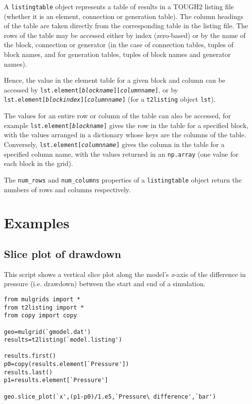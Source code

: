 A \texttt{listingtable} object represents a table of results in a TOUGH2 listing file (whether it is an element, connection or generation table).  The column headings of the table are taken directly from the corresponding table in the listing file.  The rows of the table may be accessed either by index (zero-based) or by the name of the block, connection or generator (in the case of connection tables, tuples of block names, and for generation tables, tuples of block names and generator names).

Hence, the value in the element table for a given block and column can be accessed by \texttt{lst.element[\emph{blockname}][\emph{columnname}]}, or by \texttt{lst.element[\emph{blockindex}][\emph{columnname}]} (for a \texttt{t2listing} object \texttt{lst}).

The values for an entire row or column of the table can also be accessed, for example \texttt{lst.element[\emph{blockname}]} gives the row in the table for a specified block, with the values arranged in a dictionary whose keys are the columns of the table.  Conversely, \texttt{lst.element[\emph{columnname}]} gives the column in the table for a specified column name, with the values returned in an \texttt{np.array} (one value for each block in the grid).

The \texttt{num\_rows} and \texttt{num\_columns} properties of a \texttt{listingtable} object return the numbers of rows and columns respectively.

\section{Examples}

\subsection{Slice plot of drawdown}

This script shows a vertical slice plot along the model's \emph{x}-axis of the difference in pressure (i.e. drawdown) between the start and end of a simulation.

\begin{verbatim}
from mulgrids import *
from t2listing import *
from copy import copy

geo=mulgrid(`gmodel.dat')
results=t2listing(`model.listing')

results.first()
p0=copy(results.element[`Pressure'])
results.last()
p1=results.element[`Pressure']

geo.slice_plot(`x',(p1-p0)/1.e5,`Pressure\ difference',`bar')
\end{verbatim}

